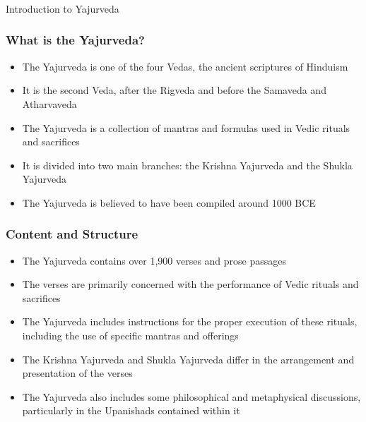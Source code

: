\begin{frame}[fragile]\frametitle{}
\begin{center}
{\Large Introduction to Yajurveda}
\end{center}
\end{frame}

\begin{frame}[fragile]\frametitle{What is the Yajurveda?}
    \begin{itemize}
        \item The Yajurveda is one of the four Vedas, the ancient scriptures of Hinduism
        \item It is the second Veda, after the Rigveda and before the Samaveda and Atharvaveda
        \item The Yajurveda is a collection of mantras and formulas used in Vedic rituals and sacrifices
        \item It is divided into two main branches: the Krishna Yajurveda and the Shukla Yajurveda
        \item The Yajurveda is believed to have been compiled around 1000 BCE
    \end{itemize}
\end{frame}

\begin{frame}[fragile]\frametitle{Content and Structure}
    \begin{itemize}
        \item The Yajurveda contains over 1,900 verses and prose passages
        \item The verses are primarily concerned with the performance of Vedic rituals and sacrifices
        \item The Yajurveda includes instructions for the proper execution of these rituals, including the use of specific mantras and offerings
        \item The Krishna Yajurveda and Shukla Yajurveda differ in the arrangement and presentation of the verses
        \item The Yajurveda also includes some philosophical and metaphysical discussions, particularly in the Upanishads contained within it
    \end{itemize}
\end{frame}

